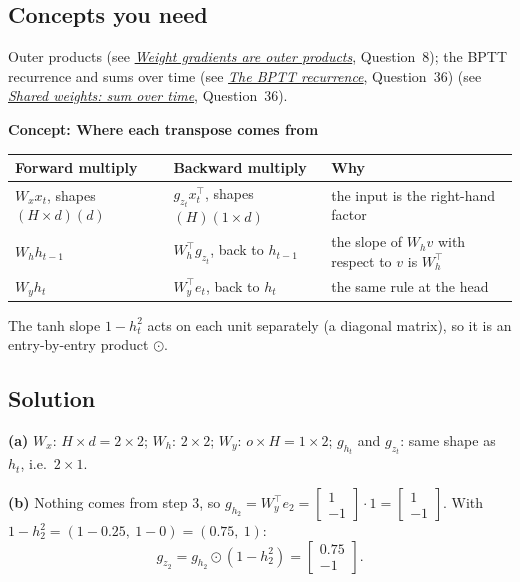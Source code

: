 \documentclass[12pt,a4paper]{article}
\newcommand{\concept}[2]{\par\medskip\phantomsection\label{#1}{\large\bfseries\color{blue!50!black} Concept: #2}\par}
\newcommand{\seeconcept}[3]{(see \hyperref[#1]{\textit{#2}}, Question~#3)}
\begin{document}
\subsection*{Concepts you need}
Outer products \seeconcept{c:outer}{Weight gradients are outer products}{8}; the BPTT recurrence and sums over time \seeconcept{c:bpttrec}{The BPTT recurrence}{36} \seeconcept{c:bpttweights}{Shared weights: sum over time}{36}.

\concept{c:transposes}{Where each transpose comes from}
\begin{center}
\begin{tabular}{@{}lll@{}}
\toprule
Forward multiply & Backward multiply & Why\\
\midrule
$W_xx_t$, shapes $(H\times d)(d)$ & $g_{z_t}x_t^\top$, shapes $(H)(1\times d)$ & the input is the right-hand factor\\
$W_hh_{t-1}$ & $W_h^\top g_{z_t}$, back to $h_{t-1}$ & the slope of $W_hv$ with respect to $v$ is $W_h^\top$\\
$W_yh_t$ & $W_y^\top e_t$, back to $h_t$ & the same rule at the head\\
\bottomrule
\end{tabular}
\end{center}
The tanh slope $1-h_t^2$ acts on each unit separately (a diagonal matrix), so it is an entry-by-entry product $\odot$.

\subsection*{Solution}
\textbf{(a)} $W_x$: $H\times d=2\times2$; $W_h$: $2\times2$; $W_y$: $o\times H=1\times2$; $g_{h_t}$ and $g_{z_t}$: same shape as $h_t$, i.e.\ $2\times1$.

\textbf{(b)} Nothing comes from step 3, so $g_{h_2}=W_y^\top e_2=\begin{bmatrix}1\\-1\end{bmatrix}\cdot1=\begin{bmatrix}1\\-1\end{bmatrix}$. With $1-h_2^2=(1-0.25,\ 1-0)=(0.75,\ 1)$:
\[
g_{z_2}=g_{h_2}\odot(1-h_2^2)=\begin{bmatrix}0.75\\-1\end{bmatrix}.
\]
\end{document}
